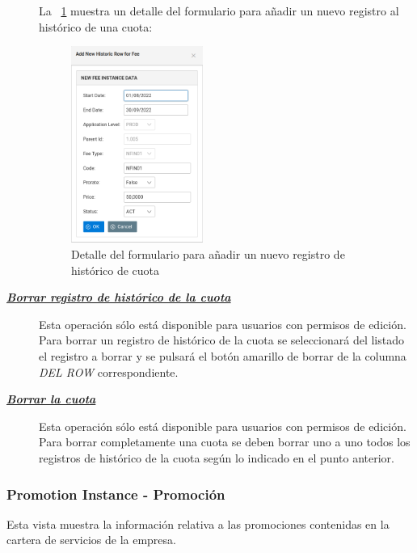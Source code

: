 \begin{description}
La \figurename~\ref{fig:nuevo-historico-cuota} muestra un detalle del formulario para añadir un nuevo registro al histórico de una cuota:

\begin{figure}[H]
  \centering
  \includegraphics[width=0.425\textwidth]{imaxes/nuevo-historico-cuota.png}
  \caption{Detalle del formulario para añadir un nuevo registro de histórico de cuota}
  \label{fig:nuevo-historico-cuota}
\end{figure}



\item[\underline{\textsl{\textbf{Borrar registro de histórico de la cuota}}}] Esta operación sólo está disponible para usuarios con permisos de edición.
Para borrar un registro de histórico de la cuota se seleccionará del listado el registro a borrar y se pulsará el botón amarillo de borrar de la columna \textit{DEL ROW} correspondiente.

\item[\underline{\textsl{\textbf{Borrar la cuota}}}] Esta operación sólo está disponible para usuarios con permisos de edición.
Para borrar completamente una cuota se deben borrar uno a uno todos los registros de histórico de la cuota según lo indicado en el punto anterior. 
\end{description}



\subsubsection{Promotion Instance - Promoción}
\label{sub:promotion}

Esta vista muestra la información relativa a las promociones contenidas en la cartera de servicios de la empresa.

